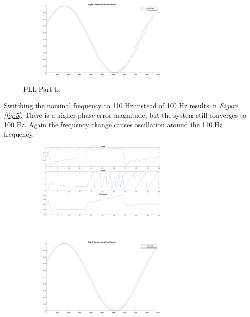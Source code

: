 \documentclass[10pt]{article}
\begin{document}
\begin{enumerate}[label=\textbf{\arabic*.}]
\begin{figure}[H]
\begin{subfigure}{\textwidth}
    \end{subfigure}%
    \\
    \begin{subfigure}{\textwidth}
      \centering
      \includegraphics[width=0.7\textwidth]{p2_b_wave.png}
    \end{subfigure}%
    \caption{PLL Part B.}
    \label{fig:4}
  \end{figure}
  Switching the nominal frequency to 110 Hz instead of 100 Hz results in 
  \emph{Figure \ref{fig:5}}. There is a higher phase error magnitude, but the 
  system still converges to 100 Hz. Again the frequency change causes 
  oscillation around the 110 Hz frequency.
  \begin{figure}[H]
    \centering
    \begin{subfigure}{\textwidth}
      \centering
      \includegraphics[width=0.7\textwidth]{p2_c.png}
    \end{subfigure}%
    \\
    \begin{subfigure}{\textwidth}
      \centering
      \includegraphics[width=0.7\textwidth]{p2_c_wave.png}

\end{subfigure}
\end{figure}
\end{enumerate}
\end{document}
